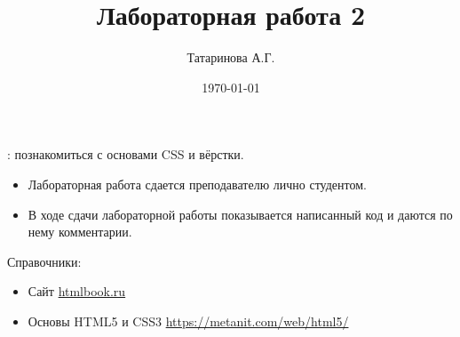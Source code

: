 \documentclass[a4paper,12pt]{extarticle}
\author{Татаринова А.Г.}
\title{Лабораторная работа 2}
\date{\today}
\begin{document}
\maketitle

: познакомиться с основами CSS и вёрстки.
\begin{itemize}
    \item Лабораторная работа сдается преподавателю лично студентом.
    \item В ходе сдачи лабораторной работы показывается написанный код и даются по нему комментарии.
\end{itemize}

Справочники:
\begin{itemize}
    \item Сайт \url{htmlbook.ru}
    \item Основы HTML5 и CSS3 \url{https://metanit.com/web/html5/}
\end{itemize}
\end{document}
